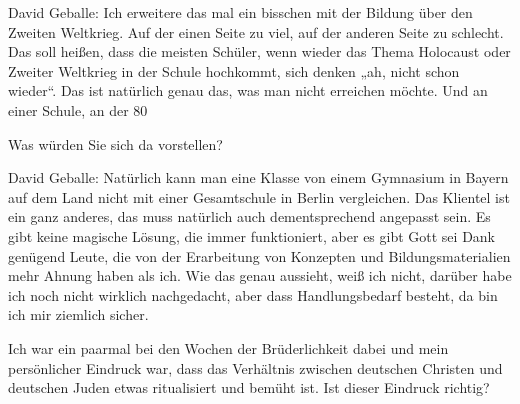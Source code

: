 David Geballe: Ich erweitere das mal ein bisschen mit der Bildung über den Zweiten Weltkrieg. Auf der einen Seite zu viel, auf der anderen Seite zu schlecht. Das soll heißen, dass die meisten Schüler, wenn wieder das Thema Holocaust oder Zweiter Weltkrieg in der Schule hochkommt, sich denken „ah, nicht schon wieder“. Das ist natürlich genau das, was man nicht erreichen möchte. Und an einer Schule, an der 80 %

 Was würden Sie sich da vorstellen? 

David Geballe: Natürlich kann man eine Klasse von einem Gymnasium in Bayern auf dem Land nicht mit einer Gesamtschule in Berlin vergleichen. Das Klientel ist ein ganz anderes, das muss natürlich auch dementsprechend angepasst sein. Es gibt keine magische Lösung, die immer funktioniert, aber es gibt Gott sei Dank genügend Leute, die von der Erarbeitung von Konzepten und Bildungsmaterialien mehr Ahnung haben als ich. Wie das genau aussieht, weiß ich nicht, darüber habe ich noch nicht wirklich nachgedacht, aber dass Handlungsbedarf besteht, da bin ich mir ziemlich sicher. 

 Ich war ein paarmal bei den Wochen der Brüderlichkeit dabei und mein persönlicher Eindruck war, dass das Verhältnis zwischen deutschen Christen und deutschen Juden etwas ritualisiert und bemüht ist. Ist dieser Eindruck richtig? 

